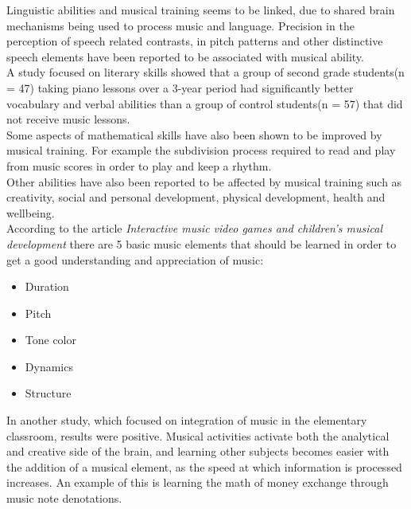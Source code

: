 	Linguistic abilities and musical training seems to be linked, due to shared brain mechanisms being used to process music and language. Precision in the perception of speech related contrasts, in pitch patterns and other distinctive speech elements have been reported to be associated with musical ability\cite{languageSkills}.\\
	
	A study focused on literary skills showed that a group of second grade students(n = 47) taking piano lessons over a 3-year period had significantly better vocabulary and verbal abilities than a group of control students(n = 57) that did not receive music lessons\cite{vocabularySkills}.\\
	
	Some aspects of mathematical skills have also been shown to be improved by musical training. For example the subdivision process required to read and play from music scores in order to play and keep a rhythm\cite{powerOfMusic}.\\
	
	Other abilities have also been reported to be affected by musical training such as creativity, social and personal development, physical development, health and wellbeing\cite{powerOfMusic}.\\
	
	According to the article \textit{Interactive music video games and children's musical development} there are 5 basic music elements that should be learned in order to get a good understanding and appreciation of music\cite[p.~99]{interactiveMusicVideoGames}:
	\begin{itemize}\label{list:basicMusic}
		\item Duration
		\item Pitch
		\item Tone color
		\item Dynamics
		\item Structure\\
	\end{itemize}
	
	In another study, which focused on integration of music in the elementary classroom, results were positive. Musical activities activate both the analytical and creative side of the brain, and learning other subjects becomes easier with the addition of a musical element, as the speed at which information is processed increases. An example of this is learning the math of money exchange through music note denotations\cite{musicIntegration}.
	
